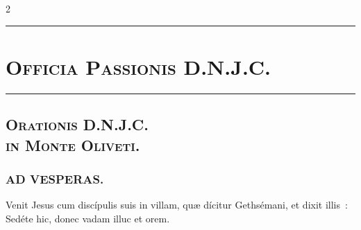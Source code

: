 \documentclass[9pt,twoside]{extarticle}
\begin{document}
\begin{multicols}{2}
\begin{center}\textcolor{red}{\rule{\linewidth}{0.5pt}} \end{center}


\section*{\center \textsc{Officia Passionis D.N.J.C.}}

\begin{center} \textsc{}\end{center}

\begin{center}\textcolor{red}{\rule{\linewidth}{0.5pt}} \end{center}
\subsection*{\center {}}
\subsubsection*{\center {}}
\subsection*{\center \textsc{Orationis D.N.J.C.\\ in Monte Oliveti.}}
\subsubsection*{\center {}}

\subsubsection*{\center \textsc{AD VESPERAS.}}
\begin{tightlist}{}
\item {} Venit Jesus cum discípulis suis in villam, quæ dícitur Gethsémani, et dixit illis~: Sedéte hic, donec vadam illuc et orem.
\item {}
\end{tightlist}


\end{multicols}
\end{document}
